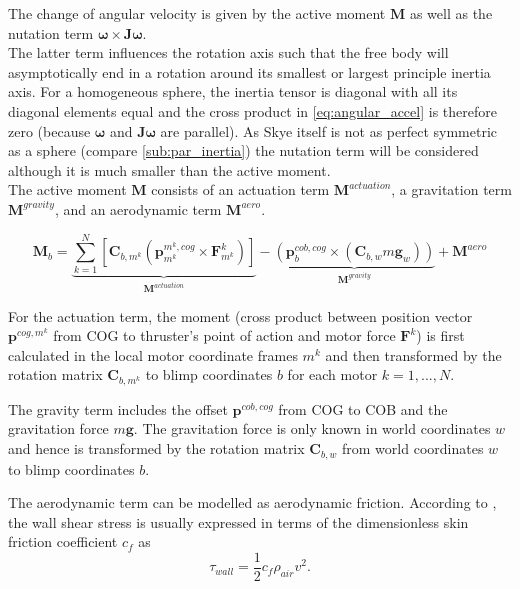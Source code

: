 The change of angular velocity is given by the active moment $\mathbf{M}$ as well as the nutation term $\boldsymbol{\omega} \times \mathbf{J} \boldsymbol{\omega}$.
\\
The latter term influences the rotation axis such that the free body will asymptotically end in a rotation around its smallest or largest principle inertia axis.
For a homogeneous sphere, the inertia tensor is diagonal with all its diagonal elements equal and the cross product in \cref{eq:angular_accel} is therefore zero (because $\boldsymbol{\omega}$ and $\mathbf{J}\boldsymbol{\omega}$ are parallel).
As Skye itself is not as perfect symmetric as a sphere (compare \cref{sub:par_inertia}) the nutation term will be considered although it is much smaller than the active moment.
\\
The active moment $\mathbf{M}$ consists of an actuation term $\mathbf{M}^{actuation}$, a gravitation term $\mathbf{M}^{gravity}$, and an aerodynamic term $\mathbf{M}^{aero}$.

\begin{equation}
\label{eq:moments}
\mathbf{M}_b = \underbrace{\sum_{k=1}^N  \left[  \mathbf{C}_{b,m^k} \left( \mathbf{p}^{m^k,cog}_{m^k} \times \mathbf{F}^k_{m^k} \right)  \right]}_{\mathbf{M}^{actuation}}
-
\underbrace{
 \left( \mathbf{p}^{cob,cog}_b \times (\mathbf{C}_{b,w}m\mathbf{g}_w) \right)
}_{\mathbf{M}^{gravity}}
+
\mathbf{M}^{aero}
\end{equation}

For the actuation term, the moment
(cross product between position vector $\mathbf{p}^{cog,m^k}$ from COG to thruster's point of action and motor force $\mathbf{F}^k$)
is first calculated in the local motor coordinate frames $m^k$ and then transformed by the rotation matrix $\mathbf{C}_{b,m^k}$ to blimp coordinates $b$ for each motor $k=1,...,N$.

The gravity term includes the offset $\mathbf{p}^{cob,cog}$ from COG to COB and 
the gravitation force $m\mathbf{g}$. The gravitation force is only known in world coordinates $w$ and hence is transformed by the rotation matrix $\mathbf{C}_{b,w}$ from world coordinates $w$ to blimp coordinates $b$.

The aerodynamic term can be modelled as aerodynamic friction. According to \citet{Kundu2012}, the wall shear stress is usually expressed in terms of the dimensionless skin friction coefficient $c_f$ as 
\begin{equation*}
\tau_{wall} = 
\frac{1}{2} c_f \rho_{air} v^2 .
\end{equation*}

